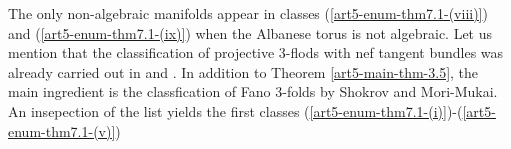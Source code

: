  The only non-algebraic manifolds appear in classes (\ref{art5-enum-thm7.1-(viii)}) and (\ref{art5-enum-thm7.1-(ix)}) when the Albanese torus is not algebraic. Let us mention that the classification of projective 3-flods with nef tangent bundles was already carried out in \cite{art5-keyCP91} and \cite{art5-keyZh90}. In addition to Theorem
 \ref{art5-main-thm-3.5}, the main ingredient is the classfication of Fano 3-folds by Shokrov and Mori-Mukai. An insepection of the list yields the first classes (\ref{art5-enum-thm7.1-(i)})-(\ref{art5-enum-thm7.1-(v)}) 

